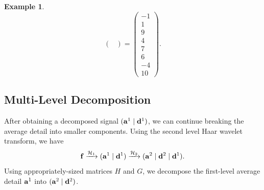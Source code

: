 \documentclass{article}
\theoremstyle{definition}
\newtheorem{example}[definition]{Example}
\begin{document}
\begin{example}
\[\begin{pmatrix}
    \end{pmatrix} =
    \begin{pmatrix}
      -1 \\ 1 \\ 9 \\ 4 \\ 7 \\ 6 \\ -4 \\ 10
    \end{pmatrix}.\]
  \end{example}

  \subsection{Multi-Level Decomposition}
  After obtaining a decomposed signal \((\vb{a}^1 \mid \vb{d}^1)\), we can continue breaking the average detail into smaller components. Using the second level Haar wavelet transform, we have
  \begin{equation*}
    \vb{f} \xrightarrow{\mathcal{H}_1} (\vb{a}^1 \mid \vb{d}^1) \xrightarrow{\mathcal{H}_2} (\vb{a}^2 \mid \vb{d}^2 \mid \vb{d}^1).
  \end{equation*}
  Using appropriately-sized matrices \(H\) and \(G\), we decompose the first-level average detail \(\vb{a}^1\) into \((\vb{a}^2 \mid \vb{d}^2)\).

\end{document}
